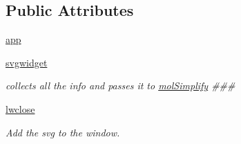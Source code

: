 \subsection*{Public Attributes}
\begin{DoxyCompactItemize}
\item 
\hyperlink{classmolSimplify_1_1Classes_1_1mGUI_1_1mGUI_a2602821a23fc89e4f1f815a9ea5d18b2}{app}
\item 
\hyperlink{classmolSimplify_1_1Classes_1_1mGUI_1_1mGUI_a34632f79e3ee73c0fb78dc0962b7412f}{svgwidget}
\begin{DoxyCompactList}\small\item\em collects all the info and passes it to \hyperlink{namespacemolSimplify}{mol\+Simplify} \#\#\# \end{DoxyCompactList}\item 
\hyperlink{classmolSimplify_1_1Classes_1_1mGUI_1_1mGUI_a76fa81d6373d1ff232058eb92e1abfac}{lwclose}
\begin{DoxyCompactList}\small\item\em Add the svg to the window. \end{DoxyCompactList}\end{DoxyCompactItemize}
